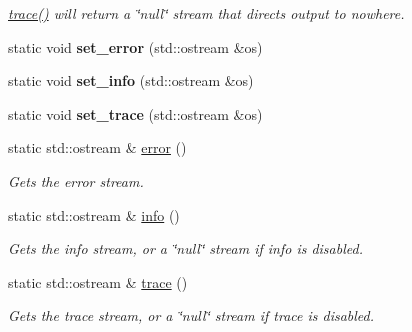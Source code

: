 \begin{DoxyCompactItemize}
\begin{DoxyCompactList}\small\item\em {\ttfamily \hyperlink{classANTL_1_1debug_a3334eff412a87eac62a8c49e940d6984}{trace()}} will return a \char`\"{}null\char`\"{} stream that directs output to nowhere. \end{DoxyCompactList}\item 
\hypertarget{classANTL_1_1debug_ab97eb7d9f6c1296e7c0af1aac87910e3}{static void {\bfseries set\-\_\-error} (std\-::ostream \&os)}\label{classANTL_1_1debug_ab97eb7d9f6c1296e7c0af1aac87910e3}

\item 
\hypertarget{classANTL_1_1debug_a35a0594661bc0c4781970fdd6f692315}{static void {\bfseries set\-\_\-info} (std\-::ostream \&os)}\label{classANTL_1_1debug_a35a0594661bc0c4781970fdd6f692315}

\item 
\hypertarget{classANTL_1_1debug_a172232f73277a6f9e3571128046a8025}{static void {\bfseries set\-\_\-trace} (std\-::ostream \&os)}\label{classANTL_1_1debug_a172232f73277a6f9e3571128046a8025}

\item 
\hypertarget{classANTL_1_1debug_ad590185429107af447480cf2d66cd5cd}{static std\-::ostream \& \hyperlink{classANTL_1_1debug_ad590185429107af447480cf2d66cd5cd}{error} ()}\label{classANTL_1_1debug_ad590185429107af447480cf2d66cd5cd}

\begin{DoxyCompactList}\small\item\em Gets the error stream. \end{DoxyCompactList}\item 
\hypertarget{classANTL_1_1debug_a6c65903df2cccb3c77df6007e83d7f73}{static std\-::ostream \& \hyperlink{classANTL_1_1debug_a6c65903df2cccb3c77df6007e83d7f73}{info} ()}\label{classANTL_1_1debug_a6c65903df2cccb3c77df6007e83d7f73}

\begin{DoxyCompactList}\small\item\em Gets the info stream, or a \char`\"{}null\char`\"{} stream if info is disabled. \end{DoxyCompactList}\item 
\hypertarget{classANTL_1_1debug_a3334eff412a87eac62a8c49e940d6984}{static std\-::ostream \& \hyperlink{classANTL_1_1debug_a3334eff412a87eac62a8c49e940d6984}{trace} ()}\label{classANTL_1_1debug_a3334eff412a87eac62a8c49e940d6984}

\begin{DoxyCompactList}\small\item\em Gets the trace stream, or a \char`\"{}null\char`\"{} stream if trace is disabled. \end{DoxyCompactList}\end{DoxyCompactItemize}


